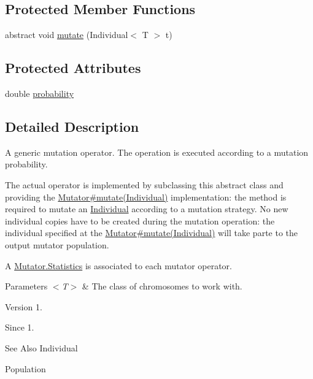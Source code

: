 \subsection*{Protected Member Functions}
\begin{DoxyCompactItemize}
\item 
abstract void \hyperlink{classjenes_1_1stage_1_1operator_1_1_mutator_3_01_t_01extends_01_chromosome_01_4_a5ea1c6fd8d4ed580d70e1fafd85bb3a8}{mutate} (Individual$<$ T $>$ t)
\end{DoxyCompactItemize}
\subsection*{Protected Attributes}
\begin{DoxyCompactItemize}
\item 
double \hyperlink{classjenes_1_1stage_1_1operator_1_1_mutator_3_01_t_01extends_01_chromosome_01_4_a60f38eb7afd1ad6a7d1c0c639df2d5fe}{probability}
\end{DoxyCompactItemize}


\subsection{Detailed Description}
A generic mutation operator. The operation is executed according to a mutation probability. 

The actual operator is implemented by subclassing this abstract class and providing the \hyperlink{}{Mutator\#mutate(\-Individual)} implementation\-: the method is required to mutate an \hyperlink{}{Individual} according to a mutation strategy. No new individual copies have to be created during the mutation operation\-: the individual specified at the \hyperlink{}{Mutator\#mutate(\-Individual)} will take parte to the output mutator population. 

A \hyperlink{}{Mutator.\-Statistics} is associated to each mutator operator.


\begin{DoxyParams}{Parameters}
{\em $<$\-T$>$} & The class of chromosomes to work with.\\
\hline
\end{DoxyParams}
\begin{DoxyVersion}{Version}
1. 
\end{DoxyVersion}
\begin{DoxySince}{Since}
1.
\end{DoxySince}
\begin{DoxySeeAlso}{See Also}
Individual 

Population 
\end{DoxySeeAlso}


